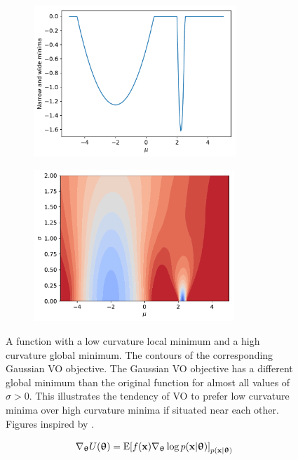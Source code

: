 \begin{figure}[tbp!]
    \begin{subfigure}[b]{0.49\textwidth}
        \centering
        \includegraphics[height=5.7cm]{graphics/var-opt-intu/variational-optimization-function-narrow_vs_wide.pdf}
        \caption{}
        \label{fig: Theory: var-opt-intu-narrow-vs-wide-function}
    \end{subfigure}
    \hfill
    \begin{subfigure}[b]{0.49\textwidth}
        \centering
        \includegraphics[height=5.7cm]{graphics/var-opt-intu/variational-optimization-contour-narrow_vs_wide.pdf}
        \caption{}
        \label{fig: Theory: var-opt-intu-narrow-vs-wide-contour}
    \end{subfigure}
    \caption{ A function with a low curvature local minimum and a high curvature global minimum.  The contours of the corresponding Gaussian \gls{VO} objective. The Gaussian \gls{VO} objective has a different global minimum than the original function for almost all values of $\sigma>0$. This illustrates the tendency of \gls{VO} to prefer low curvature minima over high curvature minima if situated near each other. Figures inspired by \cite{Huszar2017}.}
    \label{fig: Theory: var-opt-intu-narrow-vs-wide}
\end{figure}
%
%
\iffalse
\begin{equation}
    \nabla_{{\boldsymbol{\uptheta}}} U({{\boldsymbol{\uptheta}}}) = \text{E}{\left[f({\mathbf{x}})\nabla_{{\boldsymbol{\uptheta}}} \log p({\mathbf{x}}|{{\boldsymbol{\uptheta}}})\right]}_{p({\mathbf{x}}|{{\boldsymbol{\uptheta}}})}\nonumber\\
\end{equation}


